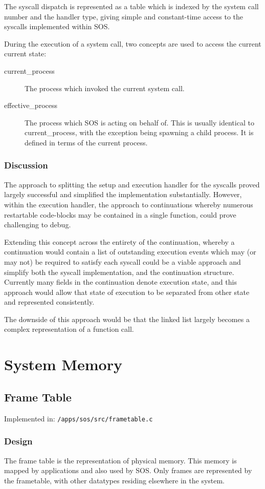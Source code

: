 \documentclass[a4paper,12pt]{article}
\begin{document}
The syscall dispatch is represented as a table which is indexed by the system
call number and the handler type, giving simple and constant-time access to
the syscalls implemented within SOS.

During the execution of a system call, two concepts are used to access the
current current state:
\begin{description}
\item[current\_process] The process which invoked the current system call.
\item[effective\_process] The process which SOS is acting on behalf of.  This
  is usually identical to current\_process, with the exception being spawning
  a child process.  It is defined in terms of the current process.
\end{description}

\subsubsection{Discussion}
The approach to splitting the setup and execution handler for the syscalls
proved largely successful and simplified the implementation substantially.  However,
within the execution handler, the approach to continuations whereby numerous
restartable code-blocks may be contained in a single function, could prove
challenging to debug.

Extending this concept across the entirety of the continuation, whereby a
continuation would contain a list of outstanding execution events which may
(or may not) be required to satisfy each syscall could be a viable approach
and simplify both the syscall implementation, and the continuation structure.
Currently many fields in the continuation denote execution state, and this
approach would allow that state of execution to be separated from other state
and represented consistently.

The downside of this approach would be that the linked list largely becomes a
complex representation of a function call.

\section{System Memory}
\subsection{Frame Table}
Implemented in: \texttt{/apps/sos/src/frametable.c}
\subsubsection{Design}
The frame table is the representation of physical memory. This memory is
mapped by applications and also used by SOS.  Only frames are represented by
the frametable, with other datatypes residing elsewhere in the system.
\end{document}
